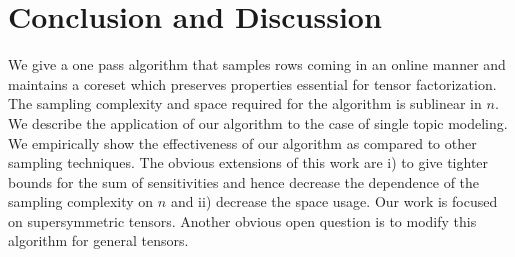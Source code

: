 \section{Conclusion and Discussion}
We give a one pass algorithm that samples rows coming in an online manner and maintains a coreset which preserves properties essential for tensor factorization. The sampling complexity and space required for the algorithm is sublinear in $n$. We describe the application of our algorithm to the case of single topic modeling. We empirically show the effectiveness of our algorithm as compared to other sampling techniques. The obvious extensions of this work are i) to give tighter bounds for the sum of sensitivities and hence decrease the dependence of the sampling complexity on $n$ and ii) decrease the space usage. Our work is focused on supersymmetric tensors. Another obvious open question is to modify this algorithm for general tensors.